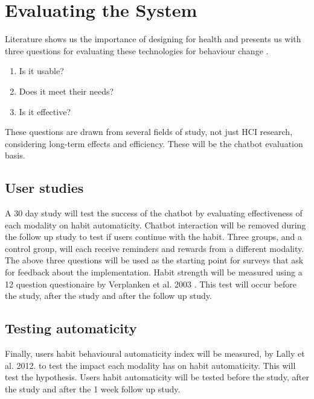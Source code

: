 
\newpage
\section{Evaluating the System}

Literature shows us the importance of designing for health and presents us with three questions for evaluating these technologies for behaviour change \cite{article_designing_for_health_behaviour_change_hci}.
\begin{enumerate}
\item Is it usable?
\item Does it meet their needs?
\item Is it effective?
\end{enumerate}
These questions are drawn from several fields of study, not just HCI research, considering long-term effects and efficiency. These will be the chatbot evaluation basis.

\subsection{User studies}
A 30 day study will test the success of the chatbot by evaluating effectiveness of each modality on habit automaticity. Chatbot interaction will be removed during the follow up study to test if users continue with the habit. Three groups, and a control group, will each receive reminders and rewards from a different modality. The above three questions will be used as the starting point for surveys that ask for feedback about the implementation. Habit strength will be measured using a 12 question questionaire by Verplanken et al. 2003 \cite{article_habit_strength}. This test will occur before the study, after the study and after the follow up study.

\subsection{Testing automaticity}
Finally, users habit behavioural automaticity index will be measured, by Lally et al. 2012. \cite{article_habit_measurement} to test the impact each modality has on habit automaticity. This will test the hypothesis.  Users habit automaticity will be tested before the study, after the study and after the 1 week follow up study.
